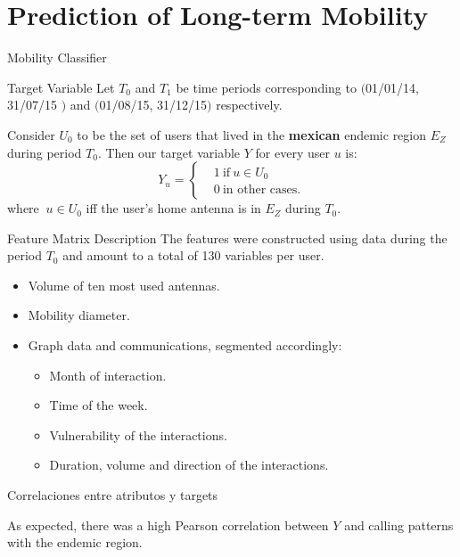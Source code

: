 \documentclass{beamer}
\begin{document}
\section{Prediction of Long-term Mobility}
\begin{frame}{Mobility Classifier}
			\begin{block}{Target Variable}
			Let $T_0$ and $T_1$ be time periods corresponding to $($01/01/14, 31/07/15 $)$ and $($01/08/15, 31/12/15$)$ respectively.

			Consider $U_0$ to be the set of users that lived in the \textbf{mexican} endemic region $E_Z$ during period $T_0$. Then our target variable $Y$ for every user $u$ is:
			\[
			Y_u =
			\begin{cases}
			&1 \ \mbox{if} \ u \in U_0  \\
			&0 \ \mbox{in other cases}.
			\end{cases}
			\]
			where $\ u \in U_0$ iff the user's home antenna is in $E_Z$ during $T_0$.
			\end{block}

\end{frame}

\begin{frame}{Feature Matrix Description}
	The features were constructed using data during the period $T_0$ and amount to a total of 130 variables per user.

	\begin{itemize}
		\item Volume of ten most used antennas.
		\item Mobility diameter.
		\item Graph data and communications, segmented accordingly:
		\begin{itemize}
			\item Month of interaction.
			\item Time of the week.
			\item Vulnerability of the interactions.
			\item Duration, volume and direction of the interactions.
		\end{itemize}
	\end{itemize}

	\begin{block}{Correlaciones entre atributos y targets}

	As expected, there was a high Pearson correlation between $Y$ and calling patterns with the endemic region.
	\end{block}

\end{frame}
\end{document}
